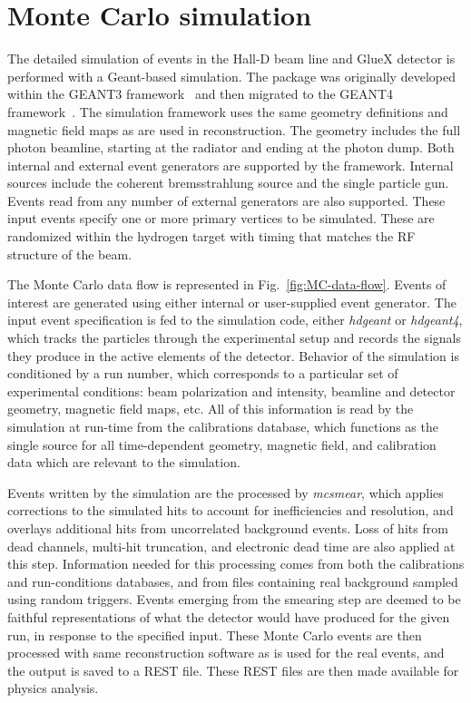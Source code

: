 \section[Monte Carlo]{Monte Carlo simulation \label{sec:simulation}}
The detailed simulation of events in the Hall-D beam line and GlueX detector is performed with a Geant-based simulation. The package was originally developed within the GEANT3 framework~\cite{Brun:1987ma} and then migrated to the GEANT4 framework~\cite{Agostinelli:2002hh,Allison:2016lfl}. The simulation framework uses the same geometry definitions and magnetic field maps as are used in reconstruction. The geometry includes the full photon beamline, starting at the radiator and ending at the photon dump. Both internal and external event generators are supported by the framework.  Internal sources include the coherent bremsstrahlung source and the single particle gun. Events read from any number of external generators are also supported. These input events specify one or more primary vertices to be simulated. These are randomized within the hydrogen target with timing that matches the RF structure of the beam.

The Monte Carlo data flow is represented in Fig.~\ref{fig:MC-data-flow}. Events of interest are generated using either internal or user-supplied event generator. The input event specification is fed to the simulation code, either {\em hdgeant} or {\em hdgeant4}, which tracks the particles through the experimental setup and records the signals they produce in the active elements of the detector. Behavior of the simulation is conditioned by a run number, which corresponds to a particular set of experimental conditions: beam polarization and intensity, beamline and detector geometry, magnetic field maps, etc. All of this information is read by the simulation at run-time from the calibrations database, which functions as the single source for all time-dependent geometry, magnetic field, and calibration data which are relevant to the simulation.

Events written by the simulation are the processed by \emph{ mcsmear}, which applies corrections to the simulated hits to account for inefficiencies and resolution, and overlays additional hits from uncorrelated background events. Loss of hits from dead channels, multi-hit truncation, and electronic dead time are also applied at this step. Information needed for this processing comes from both the calibrations and run-conditions databases, and from files containing real background sampled using random triggers. Events emerging from the smearing step are deemed to be faithful representations of what the detector would have produced for the given run, in response to the specified input. These Monte Carlo events are then processed with same reconstruction software as is used for the real events, and the output is saved to a REST file. These REST files are then made available for physics analysis.

